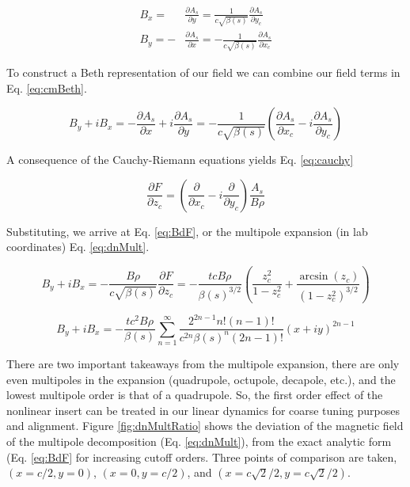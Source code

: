 \begin{equation} \label{eq:B_As}
\begin{split}
	B_x = &\frac{\partial A_s}{\partial y} = \frac{1}{c\sqrt{\beta(s)}}\frac{\partial A_s}{\partial y_c}\\
	B_y = -&\frac{\partial A_s}{\partial x} = -\frac{1}{c\sqrt{\beta(s)}}\frac{\partial A_s}{\partial x_c}
\end{split}
\end{equation}

To construct a Beth representation of our field we can combine our field terms in Eq. \ref{eq:cmBeth}.

\begin{equation} \label{eq:cmBeth}
	B_y + i B_x  = -\frac{\partial A_s}{\partial x} + i\frac{\partial A_s}{\partial y} = -\frac{1}{c\sqrt{\beta(s)}}\left(\frac{\partial A_s}{\partial x_c} - i\frac{\partial A_s}{\partial y_c}\right)
\end{equation}

A consequence of the Cauchy-Riemann equations yields Eq. \ref{eq:cauchy}

\begin{equation} \label{eq:cauchy}
	\frac{\partial F}{\partial z_c} = \left(\frac{\partial }{\partial x_c} - i\frac{\partial }{\partial y_c}\right) \frac{A_s}{B\rho}
\end{equation}

Substituting, we arrive at Eq. \ref{eq:BdF}, or the multipole expansion (in lab coordinates) Eq. \ref{eq:dnMult}.

\begin{equation} \label{eq:BdF}
	B_y + i B_x  = -\frac{B\rho}{c\sqrt{\beta(s)}}\frac{\partial F}{\partial z_c} = - \frac{t c B\rho}{\beta(s)^{3/2}} \left( \frac{z_c^2}{1 - z_c^2} + \frac{\arcsin{(z_c)}}{\left(1-z_c^2\right)^{3/2}}\right)
\end{equation}

\begin{equation} \label{eq:dnMult}
	B_y + i B_x = - \frac{t c^2 B\rho}{\beta(s)} \sum_{n=1}^{\infty} \frac{2^{2n-1}n!(n-1)!}{c^{2n}\beta(s)^n(2n-1)!} (x + i y)^{2n -1}
\end{equation}

There are two important takeaways from the multipole expansion, there are only even multipoles in the expansion (quadrupole, octupole, decapole, etc.), and the lowest multipole order is that of a quadrupole. So, the first order effect of the nonlinear insert can be treated in our linear dynamics for coarse tuning purposes and alignment. Figure \ref{fig:dnMultRatio} shows the deviation of the magnetic field of the multipole decomposition (Eq. \ref{eq:dnMult}), from the exact analytic form (Eq. \ref{eq:BdF} for increasing cutoff orders. Three points of comparison are taken, $(x=c/2,y=0)$, $(x=0,y=c/2)$, and $(x=c\sqrt{2}/2,y=c\sqrt{2}/2)$. 

